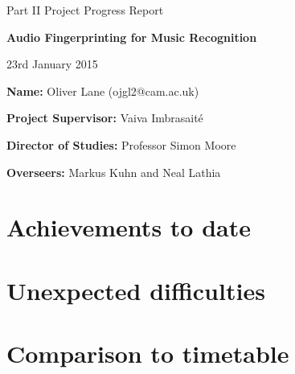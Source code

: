 \documentclass[12pt]{article}
\begin{document}
\thispagestyle{empty}

\medskip
{}
\medskip
{}

\vfil

\centerline{\large Part II Project Progress Report}
\vspace{0.4in}
\centerline{\Large\bf Audio Fingerprinting for Music Recognition}
\vspace{0.3in}
\centerline{\large 23rd January 2015}

\vfil

{\bf Name:} Oliver Lane (ojgl2@cam.ac.uk)

\vspace{0.2in}

{\bf Project Supervisor:} Vaiva Imbrasait\'{e}

\vspace{0.2in}

{\bf Director of Studies:} Professor Simon Moore

\vspace{0.2in}

{\bf Overseers:} Markus Kuhn and Neal Lathia

\vfil
\eject

\cleardoublepage
\setcounter{page}{1}

\section*{Achievements to date}


\section*{Unexpected difficulties}


\section*{Comparison to timetable}
\end{document}
